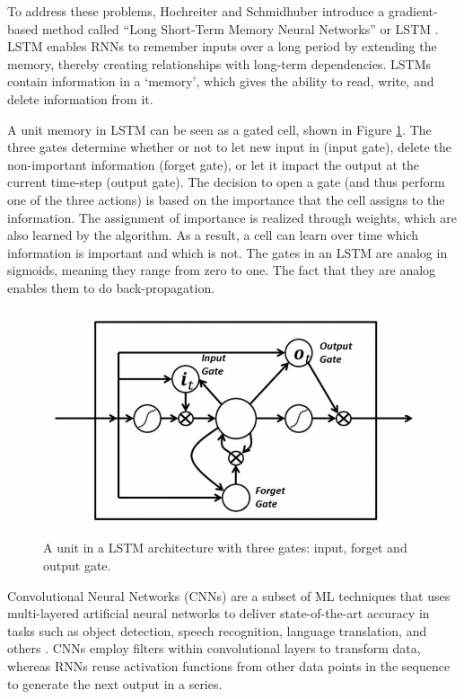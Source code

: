 To address these problems, Hochreiter and Schmidhuber introduce a gradient-based method called ``Long Short-Term Memory Neural Networks'' or LSTM \cite{HochSchm1997}. LSTM enables RNNs to remember inputs over a long period by extending the memory, thereby creating relationships with long-term dependencies. LSTMs contain information in a `memory', which gives the ability to read, write, and delete information from it. 

A unit memory in LSTM can be seen as a gated cell, shown in Figure \ref{Fig:LSTM-Unit}. The three gates determine whether or not to let new input in (input gate), delete the non-important information (forget gate), or let it impact the output at the current time-step (output gate). The decision to open a gate (and thus perform one of the three actions) is based on the importance that the cell assigns to the information. The assignment of importance is realized through weights, which are also learned by the algorithm. As a result, a cell can learn over time which information is important and which is not. The gates in an LSTM are analog in sigmoids, meaning they range from zero to one. The fact that they are analog enables them to do back-propagation.

\begin{figure}[htb]
	\centering
	\includegraphics[scale=0.4]{../Figures/rnn-three-gates}
	\caption{A unit in a LSTM architecture with three gates: input, forget and output gate. }
	\label{Fig:LSTM-Unit}
\end{figure}

Convolutional Neural Networks (CNNs) \cite{Lecun1989} are a subset of ML techniques that uses multi-layered artificial neural networks to deliver state-of-the-art accuracy in tasks such as object detection, speech recognition, language translation, and others \cite{Szegedy2013}. CNNs employ filters within convolutional layers to transform data, whereas RNNs reuse activation functions from other data points in the sequence to generate the next output in a series. 

